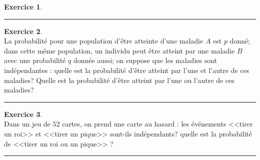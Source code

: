 \documentclass[a4paper,10pt]{article}
\theoremstyle{definition}
\theoremstyle{definition}
\newtheorem{exo}{Exercice}
\begin{document}
\begin{minipage}{1\linewidth}
\begin{minipage}[t]{0.48\linewidth}
\begin{exo}
			\centering
			\rule{1\linewidth}{0.6pt}
		\end{exo}
		
		
		
		\begin{exo}\quad\\
			La probabilité pour une population d'être atteinte
			d'une maladie $A$ est $p$ donné; dans cette même population, un individu
			peut être atteint par une maladie $B$ avec une probabilité $q$ donnée aussi; 
			on suppose que les maladies sont indépendantes : quelle est la
			probabilité d'être atteint par l'une et l'autre de ces maladies?
			Quelle est la probabilité d'être atteint par l'une ou l'autre de ces
			maladies?
			
			\centering
			\rule{1\linewidth}{0.6pt}
		\end{exo}
		
		\begin{exo} \quad\\
			Dans un jeu de $52$ cartes, on prend une carte au hasard : les événements <<tirer un roi>> et 
			<<tirer un pique>> sont-ils indépendants? quelle est la probabilité de <<tirer un roi ou
			un pique>> ?
			
			\centering
			\rule{1\linewidth}{0.6pt}
		\end{exo}
		
		
		
		
		
		
	\end{minipage}
\end{minipage}
\end{document}
